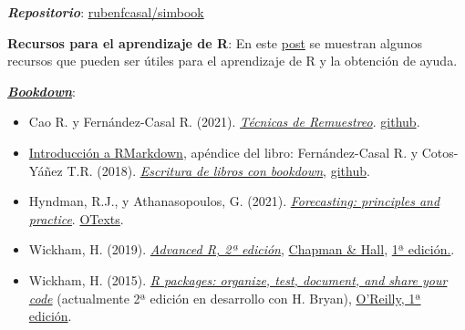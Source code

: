 \documentclass[
  10pt,
]{book}
\theoremstyle{break}
\theoremstyle{nonumberplain}
\begin{document}
\textbf{\emph{Repositorio}}: \href{https://github.com/rubenfcasal/simbook}{rubenfcasal/simbook}

\textbf{Recursos para el aprendizaje de R}: En este \href{https://rubenfcasal.github.io/post/ayuda-y-recursos-para-el-aprendizaje-de-r}{post} se muestran algunos recursos que pueden ser útiles para el aprendizaje de R y la obtención de ayuda.

\href{https://bookdown.org}{\textbf{\emph{Bookdown}}}:

\begin{itemize}
\item
  Cao R. y Fernández-Casal R. (2021). \emph{\href{https://rubenfcasal.github.io/book_remuestreo}{Técnicas de Remuestreo}}. \href{https://github.com/rubenfcasal/book_remuestreo}{github}.
\item
  \href{https://rubenfcasal.github.io/bookdown_intro/rmarkdown.html}{Introducción a RMarkdown}, apéndice del libro: Fernández-Casal R. y Cotos-Yáñez T.R. (2018). \emph{\href{https://rubenfcasal.github.io/bookdown_intro}{Escritura de libros con bookdown}}, \href{https://github.com/rubenfcasal/bookdown_intro}{github}.
\item
  Hyndman, R.J., y Athanasopoulos, G. (2021). \emph{\href{https://otexts.com/fpp3}{Forecasting: principles and practice}}. \href{https://www.amazon.es/dp/0987507133}{OTexts}.
\item
  Wickham, H. (2019). \emph{\href{https://adv-r.hadley.nz/}{Advanced R, 2ª edición}}, \href{https://www.amazon.com/dp/0815384572}{Chapman \& Hall}, \href{http://adv-r.had.co.nz/}{1ª edición.}.
\item
  Wickham, H. (2015). \emph{\href{http://r-pkgs.had.co.nz/}{R packages: organize, test, document, and share your code}} (actualmente 2ª edición en desarrollo con H. Bryan), \href{http://shop.oreilly.com/product/0636920034421.do}{O'Reilly, 1ª edición}.
\end{itemize}

  
\end{document}
